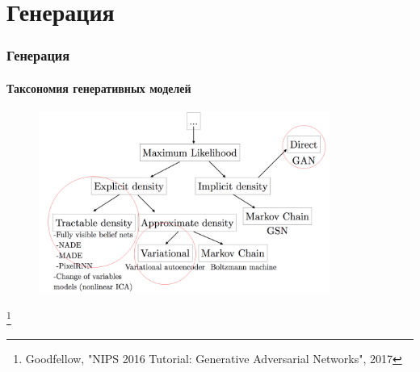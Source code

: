 \documentclass[10pt]{beamer}
\newcommand\blfootnote[1]{%
  \begingroup
  \renewcommand\thefootnote{}\footnote{#1}%
  \addtocounter{footnote}{-1}%
  \endgroup
}
\begin{document}
\section{Генерация}
\begin{frame}
\frametitle{Генерация}
\framesubtitle{Таксономия генеративных моделей}


\begin{figure}[H]
\centering
\includegraphics[width=0.85\textwidth]{images/gen_taxonomy2.png}
\end{figure}

\blfootnote{Goodfellow, "NIPS 2016 Tutorial: Generative Adversarial Networks", 2017}

\end{frame}
\end{document}
